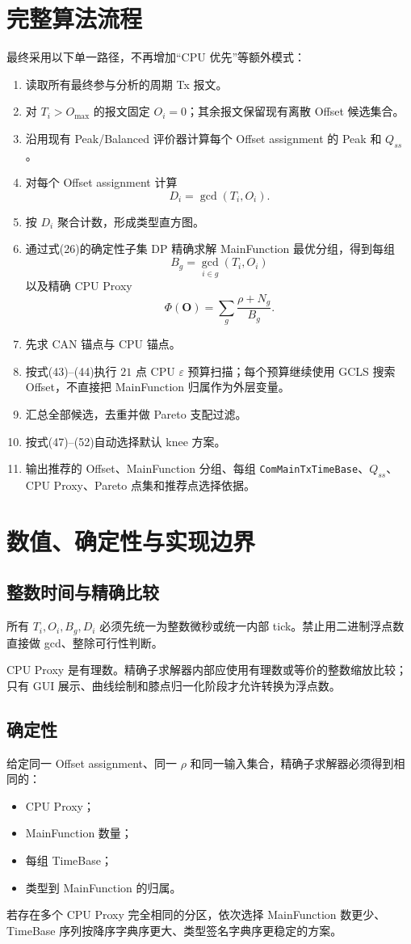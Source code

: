 \documentclass[11pt,a4paper,fontset=none]{ctexart}
\begin{document}
\section{完整算法流程}

最终采用以下单一路径，不再增加“CPU 优先”等额外模式：

\begin{enumerate}
  \item 读取所有最终参与分析的周期 Tx 报文。
  \item 对 $T_i>O_{\max}$ 的报文固定 $O_i=0$；其余报文保留现有离散 Offset 候选集合。
  \item 沿用现有 Peak/Balanced 评价器计算每个 Offset assignment 的 Peak 和 $Q_{ss}$。
  \item 对每个 Offset assignment 计算
  \[
  D_i=\gcd(T_i,O_i).
  \]
  \item 按 $D_i$ 聚合计数，形成类型直方图。
  \item 通过式(26)的确定性子集 DP 精确求解 MainFunction 最优分组，得到每组
  \[
  B_g=\gcd_{i\in g}(T_i,O_i)
  \]
  以及精确 CPU Proxy
  \[
  \Phi(\mathbf O)=\sum_g\frac{\rho+N_g}{B_g}.
  \]
  \item 先求 CAN 锚点与 CPU 锚点。
  \item 按式(43)--(44)执行 $21$ 点 CPU $\varepsilon$ 预算扫描；每个预算继续使用 GCLS 搜索 Offset，不直接把 MainFunction 归属作为外层变量。
  \item 汇总全部候选，去重并做 Pareto 支配过滤。
  \item 按式(47)--(52)自动选择默认 knee 方案。
  \item 输出推荐的 Offset、MainFunction 分组、每组 \texttt{ComMainTxTimeBase}、$Q_{ss}$、CPU Proxy、Pareto 点集和推荐点选择依据。
\end{enumerate}

\section{数值、确定性与实现边界}

\subsection{整数时间与精确比较}
所有 $T_i,O_i,B_g,D_i$ 必须先统一为整数微秒或统一内部 tick。禁止用二进制浮点数直接做 gcd、整除可行性判断。

CPU Proxy 是有理数。精确子求解器内部应使用有理数或等价的整数缩放比较；只有 GUI 展示、曲线绘制和膝点归一化阶段才允许转换为浮点数。

\subsection{确定性}
给定同一 Offset assignment、同一 $\rho$ 和同一输入集合，精确子求解器必须得到相同的：
\begin{itemize}
  \item CPU Proxy；
  \item MainFunction 数量；
  \item 每组 TimeBase；
  \item 类型到 MainFunction 的归属。
\end{itemize}
若存在多个 CPU Proxy 完全相同的分区，依次选择 MainFunction 数更少、TimeBase 序列按降序字典序更大、类型签名字典序更稳定的方案。
\end{document}
